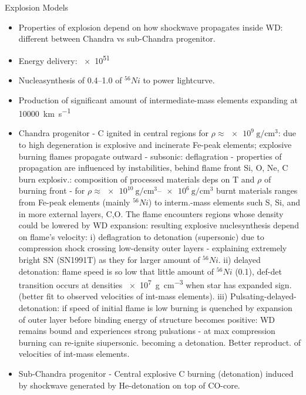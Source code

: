 \begin{frame}{Explosion Models}
    \begin{itemize}
        \item Properties of explosion depend on how shockwave propagates inside WD: different between Chandra vs sub-Chandra progenitor.
        \item Energy delivery: \SI{e51}{\erg}
        \item Nucleasynthesis of \SIrange{0.4}{1.0}{\solarmass} of $^{56}Ni$ to power lightcurve.
        \item Production of significant amount of intermediate-mass elements expanding at \SI{10000}{\kilo\meter\per\second}
\item Chandra progenitor - C ignited in central regions for $\rho\approx\SI{e9}{\gram\per\cubic\cm}$: due to high degeneration is explosive and incinerate Fe-peak elements; explosive burning flames propagate outward - subsonic: deflagration - properties of propagation are influenced by instabilities, behind flame front Si, O, Ne, C burn explosiv.: composition of processed materials deps on T and $\rho$ of burning front - for $\rho\approx\SIrange{e10}{e6}{\gram\per\cubic\cm}$ burnt materials ranges from Fe-peak elements (mainly $^{56}Ni$) to interm.-mass elements such S, Si, and in more external layers, C,O. The flame encounters regions whose density could be lowered by WD expansion: resulting explosive nuclesynthesis depend on flame's velocity: i) deflagration to detonation (supersonic) due to compression shock crossing low-density outer layers - explaining extremely bright SN (SN1991T) as they for larger amount of $^{56}Ni$. ii) delayed detonation: flame speed is so low that little amount of $^{56}Ni$ (\SI{0.1}{\solarmass}), def-det transition occurs at densities \SI{e7}{\gram\per\cubic\cm} when star has expanded sign. (better fit to observed velocities of int-mass elements). iii) Pulsating-delayed-detonation: if speed of initial flame is low burning is quenched by expansion of outer layer before binding energy of structure becomes positive: WD remains bound and experiences strong pulsations - at max compression burning can re-ignite siupersonic. becoming a detonation. Better reproduct. of velocities of int-mass elements.
\item Sub-Chandra progenitor - Central explosive C burning (detonation) induced by shockwave generated by He-detonation on top of CO-core.
    \end{itemize}
\end{frame}

